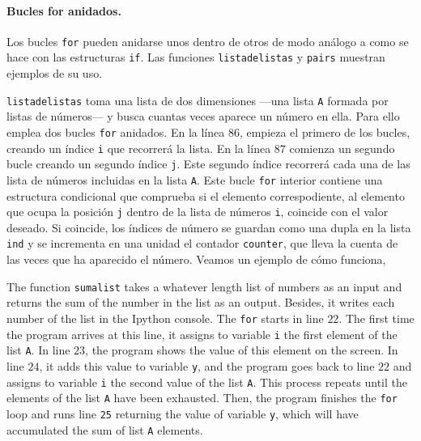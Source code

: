 \begin{paracol}{2}
\paragraph{Bucles for anidados.}  Los bucles \texttt{for} pueden anidarse unos dentro de otros de modo análogo a como se hace con las estructuras \texttt{if}. Las funciones \texttt{listadelistas} y \texttt{pairs} muestran ejemplos de su uso.

\texttt{listadelistas} toma una lista de dos dimensiones ---una lista \texttt{A} formada por listas de números--- y busca cuantas veces aparece un número en ella. Para ello emplea dos bucles \texttt{for} anidados. En la línea $86$, empieza el primero de los bucles, creando un índice \texttt{i} que recorrerá la lista. En la línea $87$ comienza un segundo bucle creando un segundo índice \texttt{j}. Este segundo índice recorrerá cada una de las lista de números incluidas en la lista \texttt{A}. Este bucle \texttt{for} interior contiene una estructura condicional que comprueba si el elemento correspodiente, al elemento que ocupa la posición \texttt{j} dentro de la lista de números \texttt{i}, coincide con el valor deseado. Si coincide, los índices de número se guardan como una dupla en la lista \texttt{ind} y se incrementa en una unidad el contador \texttt{counter}, que lleva la cuenta de las veces que ha aparecido el número. Veamos un ejemplo de cómo funciona,

\switchcolumn

The function \texttt{sumalist} takes a whatever length list of numbers as an input and returns the sum of the number in the list as an output. Besides, it writes each number of the list in the Ipython console. The \texttt{for} starts in line $22$. The first time the program arrives at this line, it assigns to variable \texttt{i} the first element of the list \texttt{A}. In line $23$, the program shows the value of this element on the screen. In line $24$, it adds this value to variable \texttt{y}, and the program goes back to line $22$ and assigns to variable \texttt{i} the second value of the list \texttt{A}. This process repeats until the elements of the list \texttt{A} have been exhausted. Then, the program finishes the \texttt{for} loop and runs line \texttt{25} returning the value of variable \texttt{y}, which will have accumulated the sum of list \texttt{A} elements.


\end{paracol}
